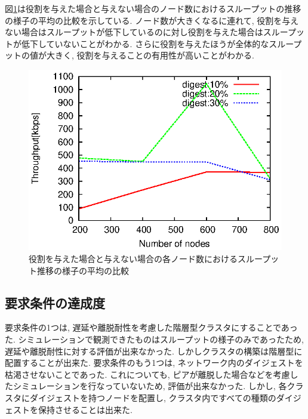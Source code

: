 \documentclass[letter]{ieicej}
\begin{document}
図\ref{fig:fig15}は役割を与えた場合と与えない場合のノード数におけるスループットの推移の様子の平均の比較を示している. ノード数が大きくなるに連れて, 役割を与えない場合はスループットが低下しているのに対し役割を与えた場合はスループットが低下していないことがわかる. さらに役割を与えたほうが全体的なスループットの値が大きく, 役割を与えることの有用性が高いことがわかる.

\begin{figure}[h]
  \begin{center}
    \includegraphics{fig15.eps}
  \end{center}
  \caption{役割を与えた場合と与えない場合の各ノード数におけるスループット推移の様子の平均の比較}
  \label{fig:fig15}
\end{figure}

\subsection{要求条件の達成度}
要求条件の1つは, 遅延や離脱耐性を考慮した階層型クラスタにすることであった. シミュレーションで観測できたものはスループットの様子のみであったため, 遅延や離脱耐性に対する評価が出来なかった. しかしクラスタの構築は階層型に配置することが出来た. 要求条件のもう1つは, ネットワーク内のダイジェストを枯渇させないことであった. これについても, ピアが離脱した場合などを考慮したシミュレーションを行なっていないため, 評価が出来なかった. しかし, 各クラスタにダイジェストを持つノードを配置し, クラスタ内ですべての種類のダイジェストを保持させることは出来た.

\end{document}
